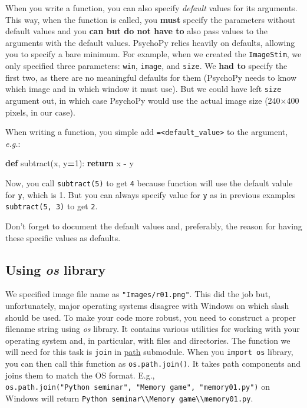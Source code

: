 \documentclass[
]{book}
\newenvironment{Shaded}{\begin{snugshade}}{\end{snugshade}}
\newcommand{\ControlFlowTok}[1]{\textcolor[rgb]{0.13,0.29,0.53}{\textbf{#1}}}
\newcommand{\DecValTok}[1]{\textcolor[rgb]{0.00,0.00,0.81}{#1}}
\newcommand{\KeywordTok}[1]{\textcolor[rgb]{0.13,0.29,0.53}{\textbf{#1}}}
\newcommand{\NormalTok}[1]{#1}
\newcommand{\OperatorTok}[1]{\textcolor[rgb]{0.81,0.36,0.00}{\textbf{#1}}}
\begin{document}
When you write a function, you can also specify \emph{default} values for its arguments. This way, when the function is called, you \textbf{must} specify the parameters without default values and you \textbf{can but do not have to} also pass values to the arguments with the default values. PsychoPy relies heavily on defaults, allowing you to specify a bare minimum. For example, when we created the \texttt{ImageStim}, we only specified three parameters: \texttt{win}, \texttt{image}, and \texttt{size}. We \textbf{had to} specify the first two, as there are no meaningful defaults for them (PsychoPy needs to know which image and in which window it must use). But we could have left \texttt{size} argument out, in which case PsychoPy would use the actual image size (240×400 pixels, in our case).

When writing a function, you simple add \texttt{=\textless{}default\_value\textgreater{}} to the argument, \emph{e.g.}:

\begin{Shaded}
\begin{Highlighting}[]
\KeywordTok{def}\NormalTok{ subtract(x, y}\OperatorTok{=}\DecValTok{1}\NormalTok{):}
    \ControlFlowTok{return}\NormalTok{ x }\OperatorTok{{-}}\NormalTok{ y}
\end{Highlighting}
\end{Shaded}

Now, you call \texttt{subtract(5)} to get \texttt{4} because function will use the default valule for \texttt{y}, which is 1. But you can always specify value for \texttt{y} as in previous examples \texttt{subtract(5,\ 3)} to get \texttt{2}.

Don't forget to document the default values and, preferably, the reason for having these specific values as defaults.

\hypertarget{using-os-library}{%
\subsection{\texorpdfstring{Using \emph{os} library}{Using os library}}\label{using-os-library}}

We specified image file name as \texttt{"Images/r01.png"}. This did the job but, unfortunately, major operating systems disagree with Windows on which slash should be used. To make your code more robust, you need to construct a proper filename string using \emph{os} library. It contains various utilities for working with your operating system and, in particular, with files and directories. The function we will need for this task is \texttt{join} in \href{https://docs.python.org/3/library/os.path.html}{path} submodule. When you \texttt{import\ os} library, you can then call this function as \texttt{os.path.join()}. It takes path components and joins them to match the OS format. E.g., \texttt{os.path.join("Python\ seminar",\ "Memory\ game",\ "memory01.py")} on Windows will return \texttt{\textquotesingle{}Python\ seminar\textbackslash{}\textbackslash{}Memory\ game\textbackslash{}\textbackslash{}memory01.py\textquotesingle{}}.
\end{document}
